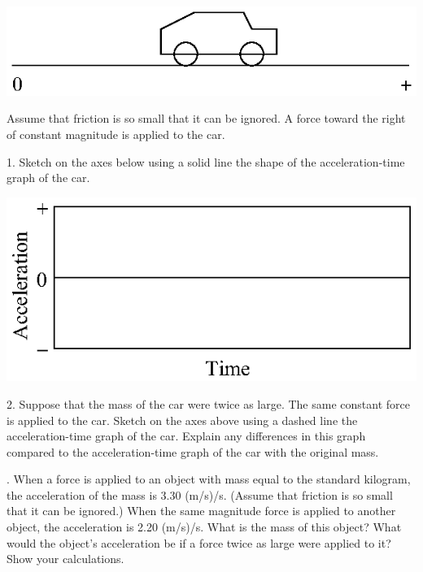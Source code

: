 {%
{\par\centering \includegraphics{force2/force2_fig6.eps} \par}

Assume that friction is so small that it can be ignored. A force toward the
right of constant magnitude is applied to the car. 

1. Sketch on the axes below using a solid line the shape of the acceleration-time
graph of the car.

{\par\centering \includegraphics{force_mass/force_mass_fig1.eps} \par}

2. Suppose that the mass of the car were twice as large. The same constant force
is applied to the car. Sketch on the axes above using a dashed line the acceleration-time
graph of the car. Explain any differences in this graph compared to the acceleration-time
graph of the car with the original mass.
\answerspace{10mm}

. When a force is applied to an object with mass equal to the standard kilogram,
the acceleration of the mass is 3.30 (m/s)/s. (Assume that friction is so small
that it can be ignored.) When the same magnitude force is applied to another
object, the acceleration is 2.20 (m/s)/s. What is the mass of this object? What
would the object's acceleration be if a force twice as large were applied to
it? Show your calculations.
\answerspace{20mm}

}
